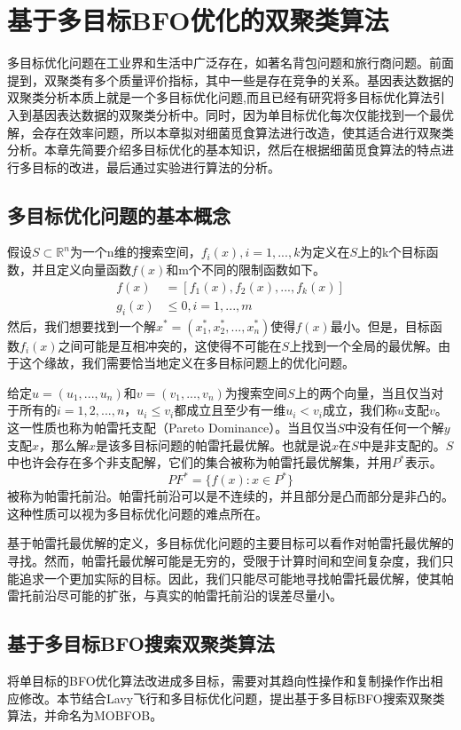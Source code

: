 \chapter{基于多目标BFO优化的双聚类算法}
多目标优化问题在工业界和生活中广泛存在，如著名背包问题和旅行商问题。前面提到，双聚类有多个质量评价指标，其中一些是存在竞争的关系。基因表达数据的双聚类分析本质上就是一个多目标优化问题,而且已经有研究将多目标优化算法引入到基因表达数据的双聚类分析中。同时，因为单目标优化每次仅能找到一个最优解，会存在效率问题，所以本章拟对细菌觅食算法进行改造，使其适合进行双聚类分析。本章先简要介绍多目标优化的基本知识，然后在根据细菌觅食算法的特点进行多目标的改进，最后通过实验进行算法的分析。

\section{多目标优化问题的基本概念}
假设$S\subset \mathbb{R}^n$为一个n维的搜索空间，$f_i(x),i=1,...,k$为定义在$S$上的k个目标函数，并且定义向量函数$f(x)$和m个不同的限制函数如下。
\begin{align}
   f(x) &= [f_1(x),f_2(x),...,f_k(x)] \\
    g_i(x) &\leq 0, i= 1,...,m
\end{align}
然后，我们想要找到一个解$x^{\ast} =(x_1^{\ast},x_2^{\ast},...,x_n^{\ast})$使得$f(x)$最小。但是，目标函数$f_i(x)$之间可能是互相冲突的，这使得不可能在$S$上找到一个全局的最优解。由于这个缘故，我们需要恰当地定义在多目标问题上的优化问题。

给定$u=(u_1,...,u_n)$和$v=(v_1,...,v_n)$为搜索空间$S$上的两个向量，当且仅当对于所有的$i=1,2,...,n$，$u_i \le v_i$都成立且至少有一维$u_i<v_i$成立，我们称$u$支配$v$。这一性质也称为帕雷托支配（Pareto Dominance）。当且仅当$S$中没有任何一个解$y$支配$x$，那么解$x$是该多目标问题的帕雷托最优解。也就是说$x$在$S$中是非支配的。$S$中也许会存在多个非支配解，它们的集合被称为帕雷托最优解集，并用$P^*$表示。
\begin{equation}
   PF^* = \{f(x): x\in P^*\} 
\end{equation}
被称为帕雷托前沿。帕雷托前沿可以是不连续的，并且部分是凸而部分是非凸的。这种性质可以视为多目标优化问题的难点所在。

基于帕雷托最优解的定义，多目标优化问题的主要目标可以看作对帕雷托最优解的寻找。然而，帕雷托最优解可能是无穷的，受限于计算时间和空间复杂度，我们只能追求一个更加实际的目标。因此，我们只能尽可能地寻找帕雷托最优解，使其帕雷托前沿尽可能的扩张，与真实的帕雷托前沿的误差尽量小。

\section{基于多目标BFO搜索双聚类算法}
将单目标的BFO优化算法改进成多目标，需要对其趋向性操作和复制操作作出相应修改。本节结合Lavy飞行和多目标优化问题，提出基于多目标BFO搜索双聚类算法，并命名为MOBFOB。

